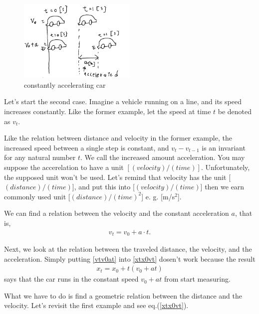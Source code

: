 \documentclass[pdflatex,sn-mathphys-num]{sn-jnl}%
\theoremstyle{thmstyleone}%
\theoremstyle{thmstyletwo}%
\theoremstyle{thmstylethree}%
\begin{document}
\begin{figure}[H]
	\centering
	\includegraphics[width=0.5\textwidth]{images/accCar.png}
	\caption{constantly accelerating car}
	\label{cacar}
\end{figure}

Let's start the second case. Imagine a vehicle running on a line, and its speed increases constantly. Like the former example, let the speed at time $t$ be denoted as $v_t$.

Like the relation between distance and velocity in the former example, the increased speed between a single step is constant, and $v_t-v_{t-1}$ is an invariant for any natural number $t$. We call the increased amount acceleration. You may suppose the accerelation to have a unit $[(velocity)/(time)]$. Unfortunately, the supposed unit won't be used. Let's remind that velocity has the unit [$(distance)/(time)$], and put this into [$(velocity)/(time)$] then we earn commonly used unit [$(distance)/(time)^2$] e. g. [m/s$^2$].

We can find a relation between the velocity and the constant acceleration $a$, that is,
\begin{eqnarray}\label{vtv0at}
	v_t = v_0 + a \cdot t .
\end{eqnarray}

Next, we look at the relation between the traveled distance, the velocity, and the acceleration. 
Simply putting \ref{vtv0at} into \ref{xtx0vt} dosen't work because the result
\begin{eqnarray}
	x_t = x_0 + t(v_0 + at )
\end{eqnarray}
says that the car runs in the constant speed $v_0 + at$ from start measuring.

What we have to do is find a geometric relation between the distance and the velocity. Let's revisit the first example and see eq.(\ref{xtx0vt}).
\end{document}
